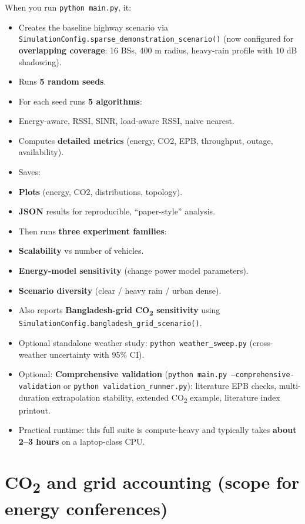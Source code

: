 \documentclass[conference]{IEEEtran}
\begin{document}
When you run \texttt{python main.py}, it:
\begin{itemize}
\item Creates the baseline highway scenario via \texttt{SimulationConfig.sparse\_demonstration\_scenario()} (now configured for \textbf{overlapping coverage}: 16 BSs, 400 m radius, heavy-rain profile with 10 dB shadowing).
\item Runs \textbf{5 random seeds}.
\item For each seed runs \textbf{5 algorithms}:
\item Energy-aware, RSSI, SINR, load-aware RSSI, naive nearest.
\item Computes \textbf{detailed metrics} (energy, CO2, EPB, throughput, outage, availability).
\item Saves:
\item \textbf{Plots} (energy, CO2, distributions, topology).
\item \textbf{JSON} results for reproducible, “paper-style” analysis.
\item Then runs \textbf{three experiment families}:
\item \textbf{Scalability} vs number of vehicles.
\item \textbf{Energy-model sensitivity} (change power model parameters).
\item \textbf{Scenario diversity} (clear / heavy rain / urban dense).
\item Also reports \textbf{Bangladesh-grid CO\textsubscript{2} sensitivity} using \texttt{SimulationConfig.bangladesh\_grid\_scenario()}.
\item Optional standalone weather study: \texttt{python weather\_sweep.py} (cross-weather uncertainty with 95\% CI).
\item Optional: \textbf{Comprehensive validation} (\texttt{python main.py --comprehensive-validation} or \texttt{python validation\_runner.py}): literature EPB checks, multi-duration extrapolation stability, extended CO\textsubscript{2} example, literature index printout.
\item Practical runtime: this full suite is compute-heavy and typically takes \textbf{about 2--3 hours} on a laptop-class CPU.
\end{itemize}


\section{CO\textsubscript{2} and grid accounting (scope for energy conferences)}
\label{sec:co2_scope}
\end{document}

